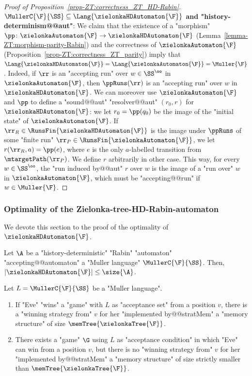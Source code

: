 \documentclass{theoretics}
\begin{document}
\begin{proof}[Proof of Proposition~\ref{prop-ZT:correctness_ZT_HD-Rabin}]
	\textbf{$\MullerC{\F}{\SS} \subseteq \Lang{\zielonkaHDAutomaton{\F}}$ and "history-determinism@@aut"}:	
	We claim that the existence of a "morphism" $\pp\colon \zielonkaAutomaton{\F} \to \zielonkaHDAutomaton{\F}$ (Lemma~\ref{lemma-ZT:morphism-parity-Rabin}) and the correctness of $\zielonkaAutomaton{\F}$ (Proposition~\ref{prop-ZT:correctness_ZT_parity}) imply that $\Lang{\zielonkaHDAutomaton{\F}} = \Lang{\zielonkaAutomaton{\F}} = \Muller{\F}$. Indeed, if $\rr$ is an "accepting run" over $w\in \SS^\oo$ in $\zielonkaAutomaton{\F}$, then $\ppRuns(\rr)$  is an "accepting run" over $w$ in $\zielonkaHDAutomaton{\F}$.
	We can moreover use $\zielonkaAutomaton{\F}$ and $\pp$ to define a "sound@@aut" "resolver@@aut" $(r_0,r)$ for $\zielonkaHDAutomaton{\F}$: we let $r_0 = \pp(q_0)$ be the image of the "initial state" of $\zielonkaAutomaton{\F}$. If $\rr_R\in \RunsFin{\zielonkaHDAutomaton{\F}}$ is the image under $\ppRuns$ of some "finite run" $\rr_P\in \RunsFin{\zielonkaAutomaton{\F}}$, we let $r(\rr_R, a) = \pp(e)$, where $e$ is the only $a$-labelled transition from $\mtargetPath(\rr_P)$. We define $r$ arbitrarily in other case. This way, for every $w\in \SS^\oo$, the "run induced by@@aut" $r$ over $w$ is the image of a "run over" $w$ in $\zielonkaAutomaton{\F}$, which must be "accepting@@run" if $w\in \Muller{\F}$.
\end{proof}

\subsubsection{Optimality of the Zielonka-tree-HD-Rabin-automaton}\label{subsubsec-zt-HD: optimality}

We devote this section to the proof of the optimality of $\zielonkaHDAutomaton{\F}$.

\begin{theorem}\label{thm-zt:optimality_ZT-HD-Rabin}
	Let $\A$ be a "history-deterministic" "Rabin" "automaton" "accepting@@automaton" a "Muller language" $\MullerC{\F}{\SS}$. Then, $ |\zielonkaHDAutomaton{\F}|\leq \size{\A}$.
\end{theorem}


\begin{proposition}\label{prop-ZT:mem-ZT-DJW}
	Let $L = \MullerC{\F}{\SS}$ be a "Muller language". 
	\begin{enumerate}
		\item If "Eve" "wins" a "game" with $L$ as "acceptance set" from a position $v$, there is a "winning strategy from" $v$ for her "implemented by@@stratMem" a "memory structure" of size $\memTree{\zielonkaTree{\F}}$.
		\item There exists a "game" $\G$ using $L$ as "acceptance condition" in which "Eve" can win from a position $v$, but there is no "winning strategy from" $v$ for her "implemented by@@stratMem" a "memory structure" of size strictly smaller than $\memTree{\zielonkaTree{\F}}$.
	\end{enumerate}
\end{proposition}
\end{document}
